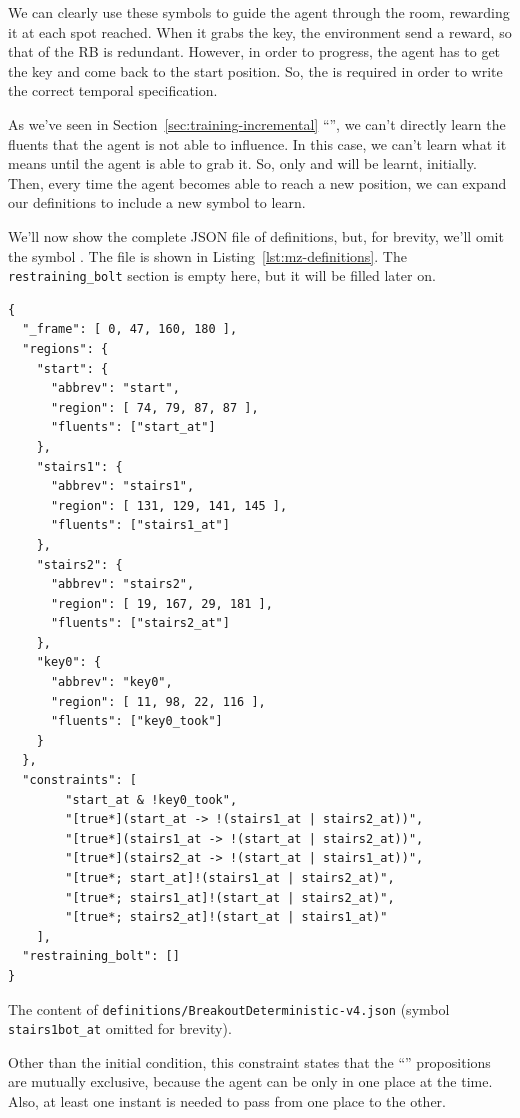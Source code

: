 We can clearly use these symbols to guide the agent through the room,
rewarding it at each spot reached. When it grabs the key, the environment send
a reward, so that of the RB is redundant. However, in order to progress, the
agent has to get the key and come back to the start position. So, the
 is required in order to write the correct temporal
specification.

As we've seen in Section~\ref{sec:training-incremental}
``'', we can't directly learn the fluents
that the agent is not able to influence. In this case, we can't learn what it
means  until the agent is able to grab it. So, only
 and  will be learnt, initially. Then, every
time the agent becomes able to reach a new position, we can expand our
definitions to include a new symbol to learn.

We'll now show the complete JSON file of definitions, but, for brevity, we'll
omit the symbol . The file is shown in
Listing~\ref{lst:mz-definitions}. The \texttt{restraining\_bolt} section is
empty here, but it will be filled later on.
\begin{listing}
\begin{verbatim}
{
  "_frame": [ 0, 47, 160, 180 ],
  "regions": {
    "start": {
      "abbrev": "start",
      "region": [ 74, 79, 87, 87 ],
      "fluents": ["start_at"]
    },
    "stairs1": {
      "abbrev": "stairs1",
      "region": [ 131, 129, 141, 145 ],
      "fluents": ["stairs1_at"]
    },
    "stairs2": {
      "abbrev": "stairs2",
      "region": [ 19, 167, 29, 181 ],
      "fluents": ["stairs2_at"]
    },
    "key0": {
      "abbrev": "key0",
      "region": [ 11, 98, 22, 116 ],
      "fluents": ["key0_took"]
    }
  },
  "constraints": [
		"start_at & !key0_took",
		"[true*](start_at -> !(stairs1_at | stairs2_at))",
		"[true*](stairs1_at -> !(start_at | stairs2_at))",
		"[true*](stairs2_at -> !(start_at | stairs1_at))",
		"[true*; start_at]!(stairs1_at | stairs2_at)",
		"[true*; stairs1_at]!(start_at | stairs2_at)",
		"[true*; stairs2_at]!(start_at | stairs1_at)"
	],
  "restraining_bolt": []
}
\end{verbatim}
\caption{The content of \texttt{definitions/BreakoutDeterministic-v4.json}
(symbol \texttt{stairs1bot\_at} omitted for brevity).}
\label{lst:mz-definitions}
\end{listing}
Other than the initial condition, this constraint states that the
``'' propositions are mutually exclusive, because the agent can be
only in one place at the time. Also, at least one instant is needed to pass
from one place to the other.


